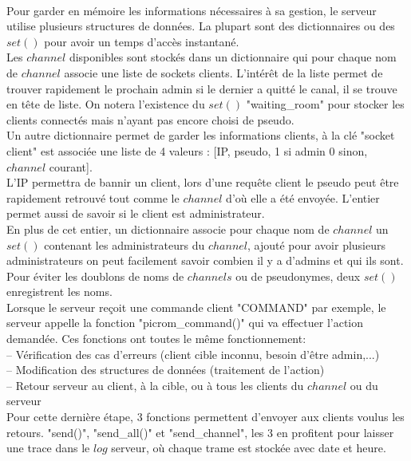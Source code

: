 \documentclass[12pt]{article}
\begin{document}
\\Pour garder en mémoire les informations nécessaires à sa gestion, le serveur utilise plusieurs
structures de données. La plupart sont des dictionnaires ou des $set()$ pour avoir un temps
d'accès instantané.
\\Les $channel$ disponibles sont stockés dans un dictionnaire qui pour chaque nom de $channel$
associe une liste de sockets clients. L'intérêt de la liste permet de trouver rapidement
le prochain admin si le dernier a quitté le canal, il se trouve en tête de liste.
On notera l'existence du $set()$ "waiting\_room" pour stocker les clients connectés mais n'ayant pas
encore choisi de pseudo.
\\Un autre dictionnaire permet de garder les informations clients, à la clé "socket client"
est associée une liste de 4 valeurs : [IP, pseudo, 1 si admin 0 sinon, $channel$ courant].
\\L'IP permettra de bannir un client, lors d'une requête client le pseudo peut être rapidement retrouvé tout comme le 
$channel$ d'où elle a été envoyée. L'entier permet aussi de savoir si le client est administrateur.
\\En plus de cet entier, un dictionnaire associe pour chaque nom de $channel$ un $set()$
contenant les administrateurs du $channel$, ajouté pour avoir plusieurs administrateurs on
peut facilement savoir combien il y a d'admins et qui ils sont.
\\Pour éviter les doublons de noms de $channels$ ou de pseudonymes, deux $set()$ enregistrent
les noms.
\\

Lorsque le serveur reçoit une commande client "COMMAND" par exemple, le serveur appelle
la fonction "picrom\_command()" qui va effectuer l'action demandée. Ces fonctions ont toutes
le même fonctionnement:
\\-- Vérification des cas d'erreurs (client cible inconnu, besoin d'être admin,...)
\\-- Modification des structures de données (traitement de l'action)
\\-- Retour serveur au client, à la cible, ou à tous les clients du $channel$ ou du serveur
\\Pour cette dernière étape, 3 fonctions permettent d'envoyer aux clients voulus les retours.
"send()",
"send\_all()" et "send\_channel", les 3 en profitent pour laisser une trace dans le $log$ serveur, où chaque trame est stockée avec date et heure.
\\
\end{document}
